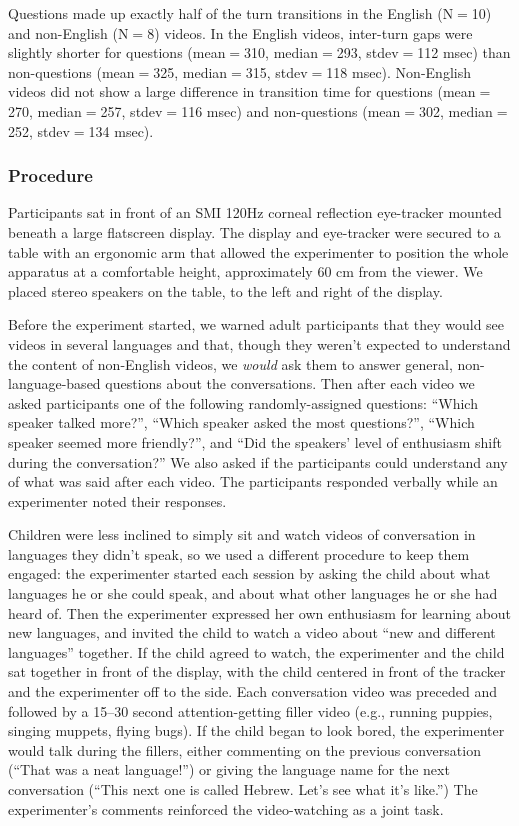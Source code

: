 \documentclass[authoryear, 12pt]{elsarticle}
\begin{document}
Questions made up exactly half of the turn transitions in the English (N$=$10) and non-English (N$=$8) videos. In the English videos, inter-turn gaps were slightly shorter for questions (mean$=$310, median$=$293, stdev$=$112 msec) than non-questions (mean$=$325, median$=$315, stdev$=$118 msec). Non-English videos did not show a large difference in transition time for questions (mean$=$270, median$=$257, stdev$=$116 msec) and non-questions (mean$=$302, median$=$252, stdev$=$134 msec).

\subsubsection*{Procedure}
Participants sat in front of an SMI 120Hz corneal reflection eye-tracker mounted beneath a large flatscreen display. The display and eye-tracker were secured to a table with an ergonomic arm that allowed the experimenter to position the whole apparatus at a comfortable height, approximately 60 cm from the viewer. We placed stereo speakers on the table, to the left and right of the display.

Before the experiment started, we warned adult participants that they would see videos in several languages and that, though they weren't expected to understand the content of non-English videos, we \textit{would} ask them to answer general, non-language-based questions about the conversations. Then after each video we asked participants one of the following randomly-assigned questions: ``Which speaker talked more?'', ``Which speaker asked the most questions?'', ``Which speaker seemed more friendly?'', and ``Did the speakers' level of enthusiasm shift during the conversation?'' We also asked if the participants could understand any of what was said after each video. The participants responded verbally while an experimenter noted their responses.

Children were less inclined to simply sit and watch videos of conversation in languages they didn't speak, so we used a different procedure to keep them engaged: the experimenter started each session by asking the child about what languages he or she could speak, and about what other languages he or she had heard of. Then the experimenter expressed her own enthusiasm for learning about new languages, and invited the child to watch a video about ``new and different languages'' together. If the child agreed to watch, the experimenter and the child sat together in front of the display, with the child centered in front of the tracker and the experimenter off to the side. Each conversation video was preceded and followed by a 15--30 second attention-getting filler video (e.g., running puppies, singing muppets, flying bugs). If the child began to look bored, the experimenter would talk during the fillers, either commenting on the previous conversation (``That was a neat language!'') or giving the language name for the next conversation (``This next one is called Hebrew. Let's see what it's like.'') The experimenter's comments reinforced the video-watching as a joint task.
\end{document}
